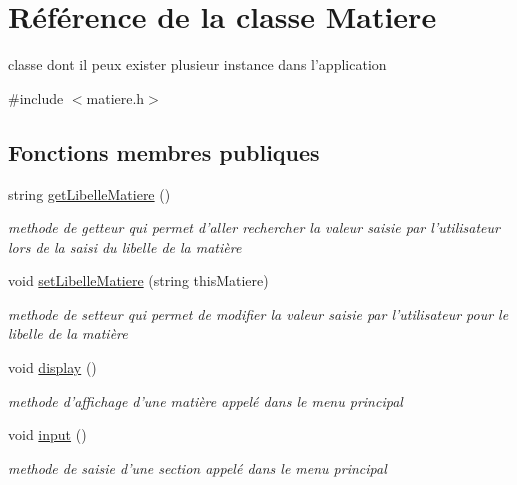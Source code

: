 \hypertarget{class_matiere}{\section{Référence de la classe Matiere}
\label{class_matiere}
}


classe dont il peux exister plusieur instance dans l'application  




{\ttfamily \#include $<$matiere.\+h$>$}

\subsection*{Fonctions membres publiques}
\begin{DoxyCompactItemize}
\item 
\hypertarget{class_matiere_a70412c2670239d7b6db78e5f631e04b2}{string \hyperlink{class_matiere_a70412c2670239d7b6db78e5f631e04b2}{get\+Libelle\+Matiere} ()}\label{class_matiere_a70412c2670239d7b6db78e5f631e04b2}

\begin{DoxyCompactList}\small\item\em methode de getteur qui permet d'aller rechercher la valeur saisie par l'utilisateur lors de la saisi du libelle de la matière \end{DoxyCompactList}\item 
\hypertarget{class_matiere_a0cfae521cb6b0a4de029e8f5c493c163}{void \hyperlink{class_matiere_a0cfae521cb6b0a4de029e8f5c493c163}{set\+Libelle\+Matiere} (string this\+Matiere)}\label{class_matiere_a0cfae521cb6b0a4de029e8f5c493c163}

\begin{DoxyCompactList}\small\item\em methode de setteur qui permet de modifier la valeur saisie par l'utilisateur pour le libelle de la matière \end{DoxyCompactList}\item 
\hypertarget{class_matiere_a83c7ad70642d1c15c2b43c5e6c2823d2}{void \hyperlink{class_matiere_a83c7ad70642d1c15c2b43c5e6c2823d2}{display} ()}\label{class_matiere_a83c7ad70642d1c15c2b43c5e6c2823d2}

\begin{DoxyCompactList}\small\item\em methode d'affichage d'une matière appelé dans le menu principal \end{DoxyCompactList}\item 
\hypertarget{class_matiere_a314ae9fc824027e032c9c02faf3ccc8f}{void \hyperlink{class_matiere_a314ae9fc824027e032c9c02faf3ccc8f}{input} ()}\label{class_matiere_a314ae9fc824027e032c9c02faf3ccc8f}

\begin{DoxyCompactList}\small\item\em methode de saisie d'une section appelé dans le menu principal \end{DoxyCompactList}\end{DoxyCompactItemize}
